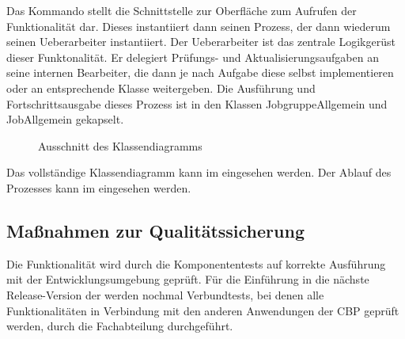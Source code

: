 Das Kommando stellt die Schnittstelle zur Oberfläche zum Aufrufen der Funktionalität dar. Dieses instantiiert dann seinen Prozess, der dann wiederum seinen Ueberarbeiter instantiiert. Der Ueberarbeiter ist das zentrale Logikgerüst dieser Funktonalität. Er delegiert Prüfungs- und Aktualisierungsaufgaben an seine internen Bearbeiter, die dann je nach Aufgabe diese selbst implementieren oder an entsprechende Klasse weitergeben. Die Ausführung und Fortschrittsausgabe dieses Prozess ist in den Klassen JobgruppeAllgemein und JobAllgemein gekapselt.

\begin{figure}[htb]
	\centering
	\caption{Ausschnitt des Klassendiagramms}
\end{figure}

Das vollständige Klassendiagramm kann im  eingesehen werden.
Der Ablauf des Prozesses kann im  eingesehen werden.

\subsection{Maßnahmen zur Qualitätssicherung}
\label{sec:Qualitaetssicherung}

Die Funktionalität  wird durch die Komponententests auf korrekte Ausführung mit der Entwicklungsumgebung geprüft. Für die Einführung in die nächste Release-Version der \CBPAD werden nochmal Verbundtests, bei denen alle Funktionalitäten in Verbindung mit den anderen Anwendungen der \acs{CBP}\xspace geprüft werden, durch die Fachabteilung durchgeführt.



